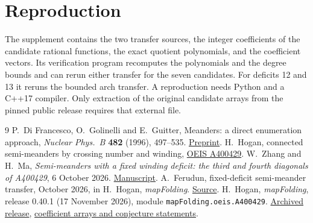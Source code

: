 \section*{Reproduction}
The supplement contains the two transfer sources, the integer coefficients of the candidate rational functions, the exact quotient polynomials, and the coefficient vectors. Its verification program recomputes the polynomials and the degree bounds and can rerun either transfer for the seven candidates. For deficits 12 and 13 it reruns the bounded arch transfer. A reproduction needs Python and a C++17 compiler. Only extraction of the original candidate arrays from the pinned public release requires that external file.

\begin{thebibliography}{9}\small
{} P.~Di Francesco, O.~Golinelli and E.~Guitter, Meanders: a direct enumeration approach, \emph{Nuclear Phys.~B} \textbf{482} (1996), 497--535. \href{https://arxiv.org/abs/hep-th/9607039}{Preprint}.
 H.~Hogan, connected semi-meanders by crossing number and winding, \href{https://oeis.org/A400429}{OEIS A400429}.
 W.~Zhang and H.~Ma, \emph{Semi-meanders with a fixed winding deficit: the third and fourth diagonals of A400429}, 6 October 2026. \href{https://oeis.org/A400429/a400429.pdf}{Manuscript}.
 A.~Ferudun, fixed-deficit semi-meander transfer, October 2026, in H.~Hogan, \emph{mapFolding}. \href{https://github.com/hunterhogan/mapFolding/blob/1862930c2f0bfe5a38ae8cd299e6b85eaa1dc632/research/matrixMeanders/fixed_deficit_semimeanders.py}{Source}.
 H.~Hogan, \emph{mapFolding}, release 0.40.1 (17 November 2026), module \texttt{mapFolding.oeis.A400429}. \href{https://pypi.org/project/mapFolding/0.40.1/}{Archived release}, \href{https://github.com/hunterhogan/mapFolding/blob/1862930c2f0bfe5a38ae8cd299e6b85eaa1dc632/mapFolding/oeis/A400429.py}{coefficient arrays and conjecture statements}.
\end{thebibliography}

